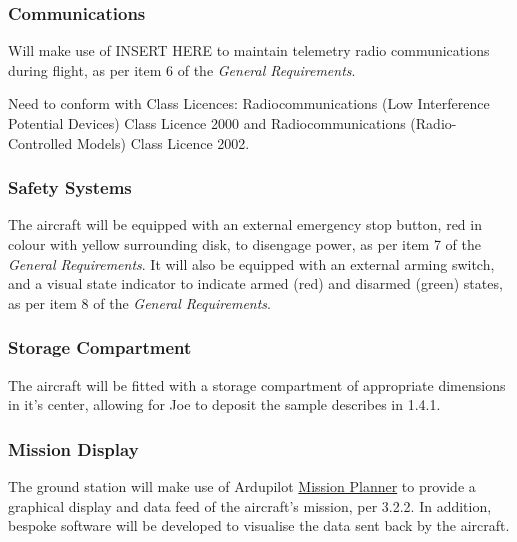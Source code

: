 \subsubsection*{Communications}
Will make use of INSERT HERE to maintain telemetry radio communications during flight, as per item 6 of the \textit{General Requirements}. 

Need to conform with Class Licences: Radiocommunications (Low Interference Potential Devices) Class Licence 2000 and Radiocommunications (Radio-Controlled Models) Class Licence 2002.

\subsubsection*{Safety Systems}
The aircraft will be equipped with an external emergency stop button, red in colour with yellow surrounding disk, to disengage power, as per item 7 of the \textit{General Requirements}. It will also be equipped with an external arming switch, and a visual state indicator to indicate armed (red) and disarmed (green) states, as per item 8 of the \textit{General Requirements}.

\subsubsection*{Storage Compartment}
The aircraft will be fitted with a storage compartment of appropriate dimensions in it's center, allowing for Joe to deposit the sample describes in 1.4.1.

\subsubsection*{Mission Display}
The ground station will make use of Ardupilot \href{http://planner.ardupilot.com/}{Mission Planner} to provide a graphical display and data feed of the aircraft's mission, per 3.2.2. In addition, bespoke software will be developed to visualise the data sent back by the aircraft.
